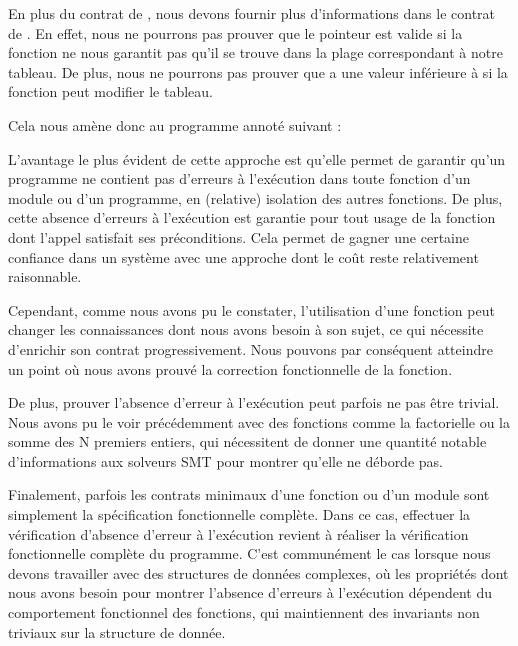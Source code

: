 En plus du contrat de , nous devons fournir plus d'informations
dans le contrat de . En effet, nous ne pourrons pas prouver
que le pointeur est valide si la fonction ne nous garantit pas qu'il se trouve
dans la plage correspondant à notre tableau. De plus,
nous ne pourrons pas prouver que  a une valeur inférieure à
 si la fonction peut modifier le tableau.


Cela nous amène donc au programme annoté suivant :






L'avantage le plus évident de cette approche est qu'elle permet de garantir
qu'un programme ne contient pas d'erreurs à l'exécution dans toute fonction d'un
module ou d'un programme, en (relative) isolation des autres fonctions. De plus,
cette absence d'erreurs à l'exécution est garantie pour tout usage de la fonction
dont l'appel satisfait ses préconditions. Cela permet de gagner une certaine
confiance dans un système avec une approche dont le coût reste relativement
raisonnable.



Cependant, comme nous avons pu le constater, l'utilisation d'une fonction peut
changer les connaissances dont nous avons besoin à son sujet, ce qui nécessite
d'enrichir son contrat progressivement. Nous pouvons par conséquent atteindre un
point où nous avons prouvé la correction fonctionnelle de la fonction.



De plus, prouver l'absence d'erreur à l'exécution peut parfois ne pas être trivial.
Nous avons pu le voir précédemment avec des fonctions comme la factorielle ou
la somme des N premiers entiers, qui nécessitent de donner une quantité notable
d'informations aux solveurs SMT pour montrer qu'elle ne déborde pas.



Finalement, parfois les contrats minimaux d'une fonction ou d'un module sont
simplement la spécification fonctionnelle complète. Dans ce cas, effectuer la
vérification d'absence d'erreur à l'exécution revient à réaliser la vérification
fonctionnelle complète du programme. C'est communément le cas lorsque nous devons
travailler avec des structures de données complexes, où les propriétés dont nous
avons besoin pour montrer l'absence d'erreurs à l'exécution dépendent du
comportement fonctionnel des fonctions, qui maintiennent des invariants non triviaux
sur la structure de donnée.


